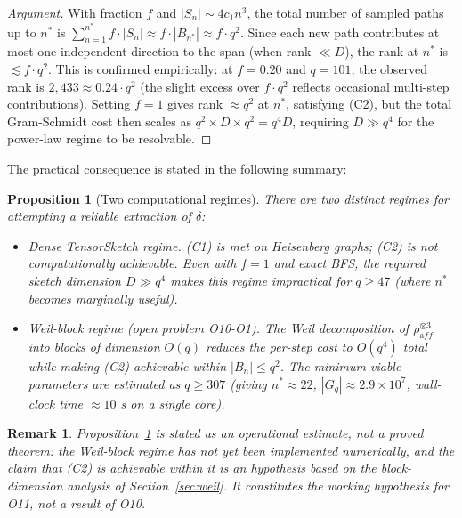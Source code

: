 \documentclass[11pt,a4paper]{article}
\newtheorem{proposition}[theorem]{Proposition}
\newtheorem{remark}[theorem]{Remark}
\begin{document}
    \begin{proof}[Argument]
With fraction $f$ and $|S_n| \sim 4c_1 n^3$, the total number of sampled
paths up to $n^*$ is $\sum_{n=1}^{n^*} f \cdot |S_n| \approx f \cdot |B_{n^*}|
\approx f \cdot q^2$.
Since each new path contributes at most one independent direction to the
span (when rank $\ll D$), the rank at $n^*$ is $\lesssim f \cdot q^2$.
This is confirmed empirically: at $f = 0.20$ and $q = 101$, the observed
rank is $2{,}433 \approx 0.24 \cdot q^2$ (the slight excess over $f \cdot q^2$
reflects occasional multi-step contributions).
Setting $f = 1$ gives rank $\approx q^2$ at $n^*$, satisfying (C2),
but the total Gram-Schmidt cost then scales as $q^2 \times D \times q^2 = q^4 D$,
requiring $D \gg q^4$ for the power-law regime to be resolvable.
    \end{proof}

    The practical consequence is stated in the following summary:

    \begin{proposition}[Two computational regimes]\label{prop:regimes}
      There are two distinct regimes for attempting a reliable extraction of $\delta$:
      \begin{itemize}
        \item \emph{Dense TensorSketch regime.}
        (C1) is met on Heisenberg graphs; (C2) is not computationally achievable.
        Even with $f = 1$ and exact BFS, the required sketch dimension $D \gg q^4$
        makes this regime impractical for $q \geq 47$
        (where $n^*$ becomes marginally useful).
        \item \emph{Weil-block regime} (open problem O10-O1).
        The Weil decomposition of $\rho_{\mathrm aff}^{\otimes 3}$ into blocks of
        dimension $O(q)$ reduces the per-step cost to $O(q^4)$ total while
        making (C2) achievable within $|B_n| \leq q^2$.
        The minimum viable parameters are estimated as $q \geq 307$
        (giving $n^* \approx 22$, $|G_q| \approx 2.9 \times 10^7$,
        wall-clock time $\approx 10$ s on a single core).
      \end{itemize}
    \end{proposition}

    \begin{remark}
      Proposition~\ref{prop:regimes} is stated as an operational estimate,
      not a proved theorem: the Weil-block regime has not yet been implemented
      numerically, and the claim that (C2) is achievable within it is an
      hypothesis based on the block-dimension analysis of Section~\ref{sec:weil}.
      It constitutes the working hypothesis for O11, not a result of O10.
    \end{remark}
\end{document}
